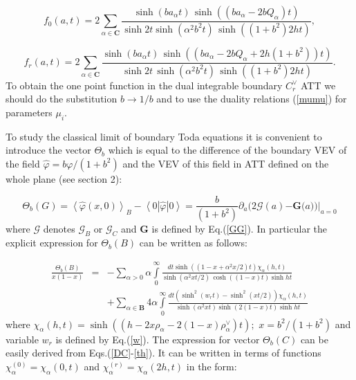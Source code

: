 \documentclass[a4paper,12pt,titlepage,final]{article}
\begin{document}
\begin{equation}
f_{0}(a,t)=2\sum_{\alpha \in \mathbf{C}}\frac{\sinh (ba_{\alpha }t)\,\sinh
((ba_{\alpha }-2bQ_{\alpha })t)}{\sinh 2t\sinh (\alpha ^{2}b^{2}t)\,\sinh
((1+b^{2})2ht)},  \label{f1}
\end{equation}

\begin{equation}
f_{r}(a,t)=2\sum_{\alpha \in \mathbf{C}}\frac{\sinh (ba_{\alpha }t)\,\sinh
((ba_{\alpha }-2bQ_{\alpha }+2h(1+b^{2}))t)}{\sinh 2t\,\sinh (\alpha
^{2}b^{2}t)\,\sinh ((1+b^{2})2ht)}.  \label{f2}
\end{equation}
To obtain the one point function in the dual integrable boundary
$C_{r}^{\vee }$ ATT we should do the
substitution $b\rightarrow 1/b$ and to
use the duality relations (\ref{mumu}) for parameters $\mu _{i}$.

To study the classical limit of boundary Toda equations it is convenient to
introduce the vector $\Theta _{b}$ which is equal to the difference of the
boundary VEV of the field $\widehat{\varphi }=b\varphi /(1+b^{2})$ and the
VEV of this field in ATT defined on the whole plane (see section 2):

\begin{equation}
\Theta _{b}(G)=\left\langle \widehat{\varphi }(x,0)\right\rangle
_{B}-\left\langle 0|\widehat{\varphi }|0\right\rangle =\frac{b}{(1+b^{2})}
\partial _{a}(2\mathcal{G}(a)\mathcal{-}\mathbf{G(}a\mathbf{))|}_{a=0}
\label{th}
\end{equation}
where $\mathcal{G}$ denotes $\mathcal{G}_{B}$ or $\mathcal{G}_{C}$ and
$\mathbf{G}$ is defined by Eq.(\ref{GG}). In particular the explicit
expression for $\Theta _{b}(B)$ can be written as follows:

\begin{eqnarray}
\frac{\Theta _{b}(B)}{x(1-x)} &=&-\sum_{\alpha >0}\alpha
\int\limits_{0}^{\infty }\frac{dt\sinh ((1-x+\alpha ^{2}x/2)t)\chi _{\alpha
}(h,t)}{\sinh (\alpha ^{2}xt/2)\,\cosh ((1-x)t)\sinh ht}  \nonumber \\
&&+\sum_{\alpha \in \mathbf{B}}4\alpha \int\limits_{0}^{\infty }
\frac{dt(\sinh ^{2}(w_{r}t)-\sinh ^{2}(xt/2))\chi _{\alpha }(h,t)}
{\sinh (\alpha^{2}xt)\sinh (2(1-x)t)\sinh ht}  \label{ttb}
\end{eqnarray}
where $\chi _{\alpha }(h,t)=\sinh ((h-2x\rho _{\alpha }-2(1-x)\rho _{\alpha
}^{\vee })t);$ $x=b^{2}/(1+b^{2})$ and variable $w_{r}$ is defined by
Eq.(\ref{w}). The expression for vector $\Theta _{b}(C)$
can be easily derived
from Eqs.(\ref{DC}-\ref{th}). It can be written in terms of functions
$\chi_{\alpha }^{(0)}=
\chi _{\alpha }(0,t)$ and $\chi _{\alpha }^{(r)}=
\chi_{\alpha }(2h,t)$ in the form:
\end{document}
